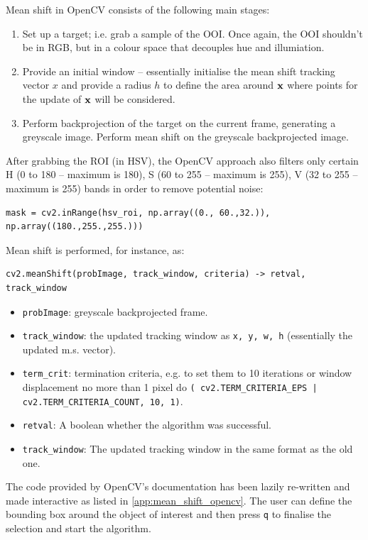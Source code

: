 \documentclass[a4paper]{article}
\begin{document}
Mean shift in OpenCV consists of the following main stages:
\begin{enumerate}
    \item Set up a target; i.e. grab a sample of the OOI. Once again, the OOI shouldn't be in RGB, but in a colour space that decouples hue and illumiation.
    \item Provide an initial window -- essentially initialise the mean shift tracking vector $x$ and provide a radius $h$ to define the area around $\textbf{x}$ where points for the update of $\textbf{x}$ will be considered.
    \item Perform backprojection of the target on the current frame, generating a greyscale image. Perform mean shift on the greyscale backprojected image. 
\end{enumerate}
After grabbing the ROI (in HSV), the OpenCV approach also filters only certain H (0 to 180 -- maximum is 180), S (60 to 255 -- maximum is 255), V (32 to 255 -- maximum is 255) bands in order to remove potential noise:
\begin{verbatim}
mask = cv2.inRange(hsv_roi, np.array((0., 60.,32.)), np.array((180.,255.,255.)))
\end{verbatim}
Mean shift is performed, for instance, as:
\begin{verbatim}
cv2.meanShift(probImage, track_window, criteria) -> retval, track_window
\end{verbatim}
\begin{itemize}
    \item \texttt{probImage}: greyscale backprojected frame.
    \item \texttt{track_window}: the updated tracking window as \texttt{x, y, w, h} (essentially the updated m.s. vector).
    \item \texttt{term_crit}: termination criteria, e.g. to set them to 10 iterations or window displacement no more than 1 pixel do \texttt{( cv2.TERM_CRITERIA_EPS | cv2.TERM_CRITERIA_COUNT, 10, 1)}.
    \item \texttt{retval}: A boolean whether the algorithm was successful.
    \item \texttt{track_window}: The updated tracking window in the same format as the old one.
\end{itemize}
The code provided by OpenCV's documentation has been lazily re-written and made interactive as listed in \ref{app:mean_shift_opencv}. The user can define the bounding box around the object of interest and then press \texttt{q} to finalise the selection and start the algorithm.
\end{document}
